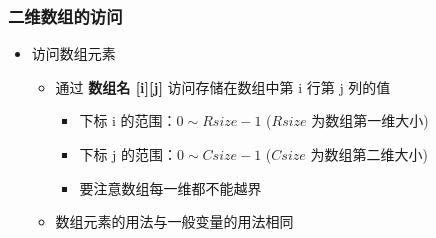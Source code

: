 \begin{frame}[fragile]
    \frametitle{二维数组的访问}

    \begin{itemize}
        \item 访问数组元素

            \begin{itemize}
                \item 通过 \textbf{数组名 [i][j]} 访问存储在数组中第 i 行第 j 列的值
                \begin{itemize}
                    \item 下标 i 的范围：$0 \sim Rsize - 1$ ($Rsize$ 为数组第一维大小)
                    \item 下标 j 的范围：$0 \sim Csize - 1$ ($Csize$ 为数组第二维大小)
                    \item 要注意数组每一维都不能越界
                \end{itemize}
                \item 数组元素的用法与一般变量的用法相同
            \end{itemize}
    \end{itemize}
\end{frame}

